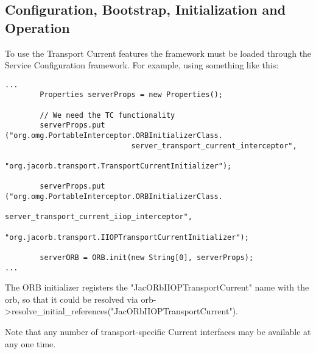 \subsection{Configuration, Bootstrap, Initialization and Operation}


To use the Transport Current features the framework must be loaded 
through the Service Configuration framework. For example, using something 
like this: 

\begin{verbatim}
...
        Properties serverProps = new Properties();

        // We need the TC functionality
        serverProps.put ("org.omg.PortableInterceptor.ORBInitializerClass.
                             server_transport_current_interceptor",
                         "org.jacorb.transport.TransportCurrentInitializer");

        serverProps.put ("org.omg.PortableInterceptor.ORBInitializerClass.
                             server_transport_current_iiop_interceptor",
                        "org.jacorb.transport.IIOPTransportCurrentInitializer");

        serverORB = ORB.init(new String[0], serverProps);
...
\end{verbatim}

The ORB initializer registers the "JacORbIIOPTransportCurrent" name with the orb, 
so that it could be resolved via orb->resolve\_initial\_references("JacORbIIOPTransportCurrent"). 

Note that any number of transport-specific Current interfaces may be available at any one time. 
